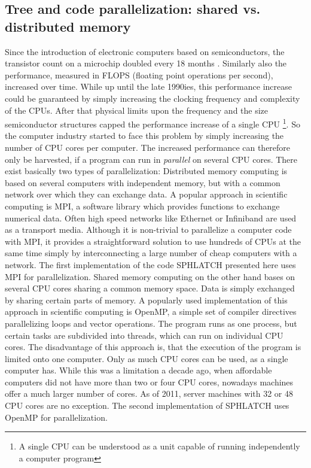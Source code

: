\subsection{Tree and code parallelization: shared vs. distributed memory}
Since the introduction of electronic computers based on semiconductors, the transistor count on a microchip doubled every 18 months \citep{Moore:1965p4006}. Similarly also the performance, measured in FLOPS (floating point operations per second), increased over time. While up until the late 1990ies, this performance increase could be guaranteed by simply increasing the clocking frequency and complexity of the CPUs. After that physical limits upon the frequency and the size semiconductor structures capped the performance increase of a single CPU \footnote{A single CPU can be understood as a unit capable of running independently a computer program}. So the computer industry started to face this problem by simply increasing the number of CPU cores per computer. The increased performance can therefore only be harvested, if a program can run in \emph{parallel} on several CPU cores. There exist basically two types of parallelization: 
Distributed memory computing is based on several computers with independent memory, but with a common network over which they can exchange data. A popular approach in scientific computing is MPI, a software library which provides functions to exchange numerical data. Often high speed networks like Ethernet or Infiniband are used as a transport media. Although it is non-trivial to parallelize a computer code with MPI, it provides a straightforward solution to use hundreds of CPUs at the same time simply by interconnecting a large number of cheap computers with a network. The first implementation of the code SPHLATCH presented here uses MPI for parallelization. 
Shared memory computing on the other hand bases on several CPU cores sharing a common memory space. Data is simply exchanged by sharing certain parts of memory. A popularly used implementation of this approach in scientific computing is OpenMP, a simple set of compiler directives parallelizing loops and vector operations. The program runs as one process, but certain tasks are subdivided into threads, which can run on individual CPU cores. The disadvantage of this approach is, that the execution of the program is limited onto one computer. Only as much CPU cores can be used, as a single computer has. While this was a limitation a decade ago, when affordable computers did not have more than two or four CPU cores, nowadays machines offer a much larger number of cores. As of 2011, server machines with 32 or 48 CPU cores are no exception. The second implementation of SPHLATCH uses OpenMP for parallelization.

